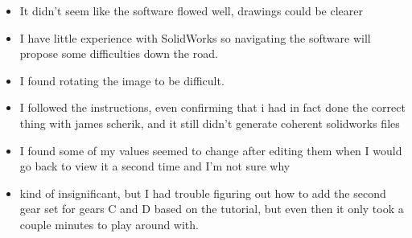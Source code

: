 \begin{itemize}
\item It didn't seem like the software flowed well, drawings could be clearer
\item I have little experience with SolidWorks so navigating the software will propose some difficulties down the road. 
\item I found rotating the image to be difficult.
\item I followed the instructions, even confirming that i had in fact done the correct thing with james scherik, and it still didn't generate coherent solidworks files
\item I found some of my values seemed to change after editing them when I would go back to view it a second time and I'm not sure why 
\item kind of insignificant, but I had trouble figuring out how to add the second gear set for gears C and D based on the tutorial, but even then it only took a couple minutes to play around with.
\end{itemize}

